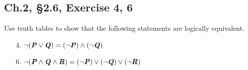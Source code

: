 \documentclass[12pt]{amsart}
\numberwithin{equation}{section}
\theoremstyle{definition}
\theoremstyle{remark}
\begin{document}


\subsection*{Ch.2, \S 2.6,  Exercise 4, 6}  Use truth tables to show that the following statements are logically equivalent. 

\begin{enumerate}

\item[4.]
$ \lnot (\textbf{\textit{P}} \lor \textbf{\textit{Q}}) = (\lnot \textbf{\textit{P}}) \land (\lnot \textbf{\textit{Q}}) $

\item[6.]
$ \lnot (\textbf{\textit{P}} \land \textbf{\textit{Q}} \land \textbf{\textit{R}}) = (\lnot \textbf{\textit{P}}) \lor (\lnot \textbf{\textit{Q}}) \lor (\lnot \textbf{\textit{R}}) $

\end{enumerate}
\end{document}

